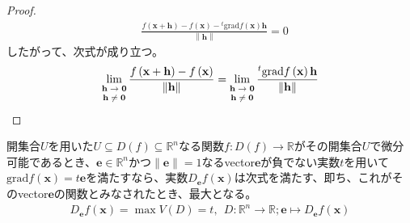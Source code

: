 \documentclass[dvipdfmx]{jsarticle}
\begin{document}
\begin{proof}
\begin{align*}
{\begin{matrix}
\end{matrix}}\frac{f\left( \mathbf{x} + \mathbf{h} \right) - f\left( \mathbf{x} \right) -{}^{t}\mathrm{grad}f\left( \mathbf{x} \right)\mathbf{h}}{\left\| \mathbf{h} \right\|} = 0
\end{align*}
したがって、次式が成り立つ。
\begin{align*}
\lim_{\scriptsize \begin{matrix}
\mathbf{h} \rightarrow \mathbf{0} \\
\mathbf{h} \neq \mathbf{0} \\
\end{matrix}}\frac{f\left( \mathbf{x} + \mathbf{h} \right) - f\left( \mathbf{x} \right)}{\left\| \mathbf{h} \right\|} = \lim_{\scriptsize \begin{matrix}
\mathbf{h} \rightarrow \mathbf{0} \\
\mathbf{h} \neq \mathbf{0} \\
\end{matrix}}\frac{{}^{t}\mathrm{grad}f\left( \mathbf{x} \right)\mathbf{h}}{\left\| \mathbf{h} \right\|}
\end{align*}
\end{proof}
\begin{thm}\label{4.2.5.5}
開集合$U$を用いた$U \subseteq D(f) \subseteq \mathbb{R}^{n}$なる関数$f:D(f) \rightarrow \mathbb{R}$がその開集合$U$で微分可能であるとき、$\mathbf{e} \in \mathbb{R}^{n}$かつ$\left\| \mathbf{e} \right\| = 1$なるvector$\mathbf{e}$が負でない実数$t$を用いて$\mathrm{grad}f\left( \mathbf{x} \right) = t\mathbf{e}$を満たすなら、実数$D_{\mathbf{e}}f\left( \mathbf{x} \right)$は次式を満たす、即ち、これがそのvector$\mathbf{e}$の関数とみなされたとき、最大となる。
\begin{align*}
D_{\mathbf{e}}f\left( \mathbf{x} \right) = \max{V(D)} = t,\ \ D:\mathbb{R}^{n} \rightarrow \mathbb{R};\mathbf{e} \mapsto D_{\mathbf{e}}f\left( \mathbf{x} \right)
\end{align*}
\end{thm}
\end{document}
